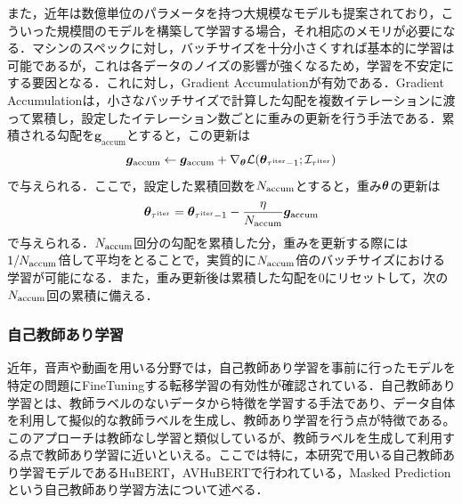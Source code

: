 \documentclass[12pt]{jarticle}
\numberwithin{equation}{section}    %
\numberwithin{figure}{section}      %
\numberwithin{table}{section}      %
\begin{document}
また，近年は数億単位のパラメータを持つ大規模なモデルも提案されており，こういった規模間のモデルを構築して学習する場合，それ相応のメモリが必要になる．マシンのスペックに対し，バッチサイズを十分小さくすれば基本的に学習は可能であるが，これは各データのノイズの影響が強くなるため，学習を不安定にする要因となる．これに対し，Gradient Accumulationが有効である．Gradient Accumulationは，小さなバッチサイズで計算した勾配を複数イテレーションに渡って累積し，設定したイテレーション数ごとに重みの更新を行う手法である．累積される勾配を$\bm{g}_{\text{accum}}$とすると，この更新は
\begin{equation}
    \bm{g}_{\text{accum}} \gets \bm{g}_{\text{accum}} + \nabla_{\bm{\theta}} \mathcal{L}(\bm{\theta}_{\tau^{\text{iter}} - 1}; \mathcal{I}_{\tau^{\text{iter}}})
\end{equation}
で与えられる．ここで，設定した累積回数を$N_{\text{accum}}$とすると，重み$\bm{\theta}$の更新は
\begin{equation}
    \bm{\theta}_{\tau^{\text{iter}}} = \bm{\theta}_{\tau^{\text{iter}} - 1} - \frac{\eta}{N_{\text{accum}}} \bm{g}_{\text{accum}}
\end{equation}
で与えられる．$N_{\text{accum}}$回分の勾配を累積した分，重みを更新する際には$1 / N_{\text{accum}}$倍して平均をとることで，実質的に$N_{\text{accum}}$倍のバッチサイズにおける学習が可能になる．また，重み更新後は累積した勾配を0にリセットして，次の$N_{\text{accum}}$回の累積に備える．

\subsubsection{自己教師あり学習}
近年，音声や動画を用いる分野では，自己教師あり学習を事前に行ったモデルを特定の問題にFineTuningする転移学習の有効性が確認されている．自己教師あり学習とは、教師ラベルのないデータから特徴を学習する手法であり、データ自体を利用して擬似的な教師ラベルを生成し、教師あり学習を行う点が特徴である。このアプローチは教師なし学習と類似しているが、教師ラベルを生成して利用する点で教師あり学習に近いといえる。ここでは特に，本研究で用いる自己教師あり学習モデルであるHuBERT\cite{hsu2021hubert}，AVHuBERT\cite{shi2022learning}で行われている，Masked Predictionという自己教師あり学習方法について述べる．
\end{document}
